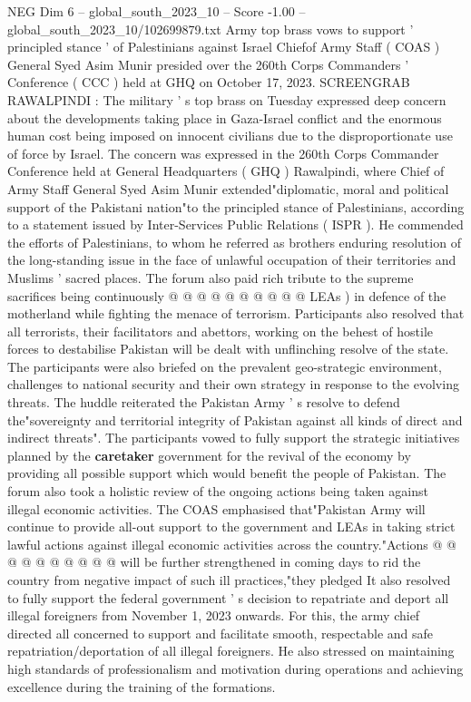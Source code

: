 \begin{textsample}{NEG Dim 6 – global\_south\_2023\_10 – Score -1.00 – global\_south\_2023\_10/102699879.txt}  \label{ex:f6_neg_152}
Army top brass vows to support ' principled stance ' of Palestinians against Israel Chiefof Army Staff ( COAS ) General Syed Asim Munir presided over the 260th Corps Commanders ' Conference ( CCC ) held at GHQ on October 17, 2023.
SCREENGRAB RAWALPINDI : The military ' s top brass on Tuesday expressed deep concern about the developments taking place in Gaza-Israel conflict and the enormous human cost being imposed on innocent civilians due to the disproportionate use of force by Israel.
The concern was expressed in the 260th Corps Commander Conference held at General Headquarters ( GHQ ) Rawalpindi, where Chief of Army Staff General Syed Asim Munir extended"diplomatic, moral and political support of the Pakistani nation"to the principled stance of Palestinians, according to a statement issued by Inter-Services Public Relations ( ISPR ).
He commended the efforts of Palestinians, to whom he referred as brothers enduring resolution of the long-standing issue in the face of unlawful occupation of their territories and Muslims ' sacred places.
The forum also paid rich tribute to the supreme sacrifices being continuously @ @ @ @ @ @ @ @ @ @ LEAs ) in defence of the motherland while fighting the menace of terrorism.
Participants also resolved that all terrorists, their facilitators and abettors, working on the behest of hostile forces to destabilise Pakistan will be dealt with unflinching resolve of the state.
The participants were also briefed on the prevalent geo-strategic environment, challenges to national security and their own strategy in response to the evolving threats.
The huddle reiterated the Pakistan Army ' s resolve to defend the"sovereignty and territorial integrity of Pakistan against all kinds of direct and indirect threats".
The participants vowed to fully support the strategic initiatives planned by the \textbf{caretaker} government for the revival of the economy by providing all possible support which would benefit the people of Pakistan.
The forum also took a holistic review of the ongoing actions being taken against illegal economic activities.
The COAS emphasised that"Pakistan Army will continue to provide all-out support to the government and LEAs in taking strict lawful actions against illegal economic activities across the country."Actions @ @ @ @ @ @ @ @ @ @ will be further strengthened in coming days to rid the country from negative impact of such ill practices,"they pledged It also resolved to fully support the federal government ' s decision to repatriate and deport all illegal foreigners from November 1, 2023 onwards.
For this, the army chief directed all concerned to support and facilitate smooth, respectable and safe repatriation/deportation of all illegal foreigners.
He also stressed on maintaining high standards of professionalism and motivation during operations and achieving excellence during the training of the formations.

\end{textsample}
